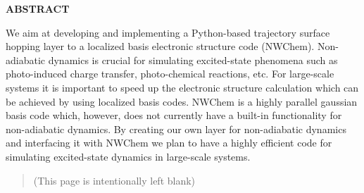     \newpage
    \begin{center}
        \LARGE{\textbf{\uppercase{Abstract}}}
    \end{center}
    \vspace{2cm}
    We aim at developing and implementing a Python-based trajectory surface hopping layer to a localized basis electronic structure code (NWChem). Non-adiabatic dynamics is crucial for simulating excited-state phenomena such as photo-induced charge transfer, photo-chemical reactions, etc. For large-scale systems it is important to speed up the electronic structure calculation which can be achieved by using localized basis codes. NWChem is a highly parallel gaussian basis code which, however, does not currently have a built-in functionality for non-adiabatic dynamics. By creating our own layer for non-adiabatic dynamics and interfacing it with NWChem we plan to have a highly efficient code for simulating excited-state dynamics in large-scale systems.
    
    
    \newpage
    \begin{center}
        \listoffigures
    \end{center}
    \vspace{2cm}
    
    \newpage
    \tableofcontents
    \newpage
    \thispagestyle{empty}
    \mbox{}
    \vspace*{\fill} 
    \begin{quote} 
    \centering 
    (This page is intentionally left blank)
    \end{quote}
    \vspace*{\fill}
    

